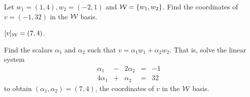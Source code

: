 \documentclass{ximera}
\begin{document}
\begin{exercise} \label{c7.1.1}
Let $w_1 = (1,4), w_2 = (-2,1)$ and ${\cal W} = \{w_1,w_2\}$.
Find the coordinates of $v=(-1,32)$ in the ${\cal W}$ basis.

\begin{solution}

\ans $[v]_{\cal W} = (7,4)$.

\soln Find the scalars $\alpha_1$ and $\alpha_2$ such that $v = \alpha_1w_1
+ \alpha_2w_2$.  That is, solve the linear system
\[ \begin{array}{rrrrr}
\alpha_1 & - & 2\alpha_2 & = & -1 \\
4\alpha_1 & + & \alpha_2 & = & 32 \end{array} \]
to obtain $(\alpha_1,\alpha_2) = (7,4)$, the coordinates
of $v$ in the ${\cal W}$ basis.

\end{solution}
\end{exercise}
\end{document}
